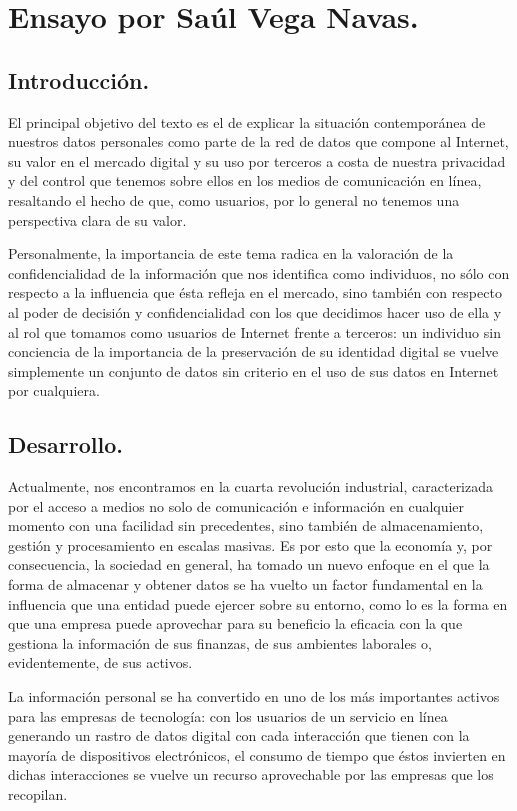 \section*{Ensayo por Saúl Vega Navas.}

\subsection*{Introducción.}
El principal objetivo del texto es el de explicar la situación contemporánea de nuestros datos personales como parte de la red de datos que compone al Internet, su valor en el mercado digital y su uso por terceros a costa de nuestra privacidad y del control que tenemos sobre ellos en los medios de comunicación en línea, resaltando el hecho de que, como usuarios, por lo general no tenemos una perspectiva clara de su valor.

Personalmente, la importancia de este tema radica en la valoración de la confidencialidad de la información que nos identifica como individuos, no sólo con respecto a la influencia que ésta refleja en el mercado, sino también con respecto al poder de decisión y confidencialidad con los que decidimos hacer uso de ella y al rol que tomamos como usuarios de Internet frente a terceros: un individuo sin conciencia de la importancia de la preservación de su identidad digital se vuelve simplemente un conjunto de datos sin criterio en el uso de sus datos en Internet por cualquiera.
\subsection*{Desarrollo.}
Actualmente, nos encontramos en la cuarta revolución industrial, caracterizada por el acceso a medios no solo de comunicación e información en cualquier momento con una facilidad sin precedentes, sino también de almacenamiento, gestión y procesamiento en escalas masivas. Es por esto que la economía y, por consecuencia, la sociedad en general, ha tomado un nuevo enfoque en el que la forma de almacenar y obtener datos se ha vuelto un factor fundamental en la influencia que una entidad puede ejercer sobre su entorno, como lo es la forma en que una empresa puede aprovechar para su beneficio la eficacia con la que gestiona la información de sus finanzas, de sus ambientes laborales o, evidentemente, de sus activos.

La información personal se ha convertido en uno de los más importantes activos para las empresas de tecnología: con los usuarios de un servicio en línea generando un rastro de datos digital con cada interacción que tienen con la mayoría de dispositivos electrónicos, el consumo de tiempo que éstos invierten en dichas interacciones se vuelve un recurso aprovechable por las empresas que los recopilan.

